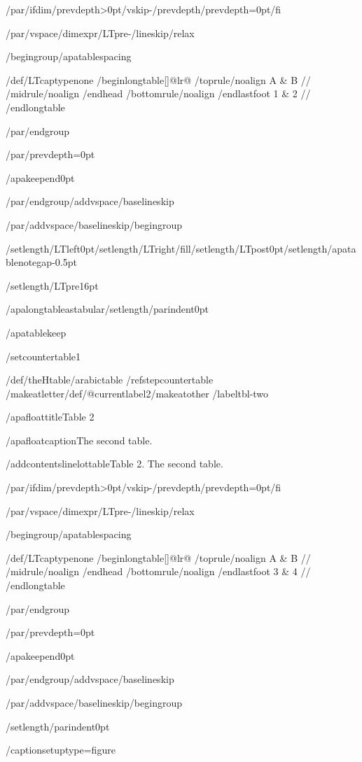 /par/ifdim/prevdepth>0pt/vskip-/prevdepth/prevdepth=0pt/fi

/par/vspace{/dimexpr/LTpre-/lineskip/relax}

/begingroup/apatablespacing

{/def/LTcaptype{none} %
/begin{longtable}[]{@{}lr@{}}
/toprule/noalign{}
A & B //
/midrule/noalign{}
/endhead
/bottomrule/noalign{}
/endlastfoot
1 & 2 //
/end{longtable}
}

/par/endgroup

/par/prevdepth=0pt

/apakeepend{0pt}

/par/endgroup/addvspace{/baselineskip}

/par/addvspace{/baselineskip}/begingroup

/setlength{/LTleft}{0pt}/setlength{/LTright}{/fill}/setlength{/LTpost}{0pt}/setlength{/apatablenotegap}{-0.5pt}

/setlength{/LTpre}{16pt}

/apalongtableastabular/setlength{/parindent}{0pt}

/apatablekeep

/setcounter{table}{1}

/def/theHtable{/arabic{table}}%
/refstepcounter{table}%
/makeatletter/def/@currentlabel{2}/makeatother%
/label{tbl-two}

/apafloattitle{Table 2}

/apafloatcaption{The second table.}

/addcontentsline{lot}{table}{Table 2. The second table.}

/par/ifdim/prevdepth>0pt/vskip-/prevdepth/prevdepth=0pt/fi

/par/vspace{/dimexpr/LTpre-/lineskip/relax}

/begingroup/apatablespacing

{/def/LTcaptype{none} %
/begin{longtable}[]{@{}lr@{}}
/toprule/noalign{}
A & B //
/midrule/noalign{}
/endhead
/bottomrule/noalign{}
/endlastfoot
3 & 4 //
/end{longtable}
}

/par/endgroup

/par/prevdepth=0pt

/apakeepend{0pt}

/par/endgroup/addvspace{/baselineskip}

/par/addvspace{/baselineskip}/begingroup

/setlength{/parindent}{0pt}

/captionsetup{type=figure}

